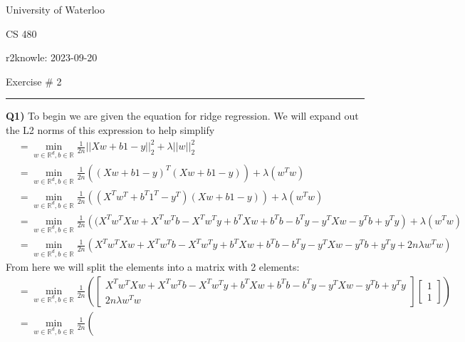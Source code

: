 \documentclass{article}
\begin{document}
\begin{titlepage}
	\setlength{\parindent}{0pt}
	\large

\vspace*{-2cm}


University of Waterloo \par
CS 480 \par
\vspace{0.05cm}
r2knowle: 2023-09-20
\vspace{0.2cm}

{\huge Exercise \# 2 \par}
\hrule

\vspace{0.5cm}
\textbf{Q1)} To begin we are given the equation for ridge regression. We will expand out the L2 norms of this expression to help simplify
\begin{align*} 
&= \displaystyle \min_{w \in \mathbb{R}^d, b \in \mathbb{R}} \frac{1}{2n}||Xw + b1 - y||^2_2 + \lambda||w||^2_2 \\
&= \displaystyle \min_{w \in \mathbb{R}^d, b \in \mathbb{R}} 
\frac{1}{2n} \left( (Xw + b1 - y)^T(Xw + b1 - y) \right) + \lambda \left( w^Tw \right) \\
&= \displaystyle \min_{w \in \mathbb{R}^d, b \in \mathbb{R}} 
\frac{1}{2n} \left( (X^Tw^T + b^T1^T - y^T)(Xw + b1 - y) \right) + \lambda \left( w^Tw \right) \\
&= \displaystyle \min_{w \in \mathbb{R}^d, b \in \mathbb{R}} 
\frac{1}{2n} \left( (X^Tw^TXw + X^Tw^Tb - X^Tw^Ty +b^TXw+ b^Tb -b^Ty -y^TXw -y^Tb + y^Ty \right) + \lambda \left( w^Tw \right) \\
&= \displaystyle \min_{w \in \mathbb{R}^d, b \in \mathbb{R}} 
\frac{1}{2n} \left( X^Tw^TXw + X^Tw^Tb - X^Tw^Ty +b^TXw+ b^Tb -b^Ty -y^TXw -y^Tb + y^Ty + 2n\lambda w^Tw \right)
\end{align*}
From here we will split the elements into a matrix with 2 elements:
\begin{align*} 
&= \displaystyle \min_{w \in \mathbb{R}^d, b \in \mathbb{R}} \frac{1}{2n} \left(
\begin{bmatrix}
X^Tw^TXw + X^Tw^Tb - X^Tw^Ty +b^TXw+ b^Tb -b^Ty -y^TXw -y^Tb + y^Ty\\
2n\lambda w^Tw 
\end{bmatrix} \begin{bmatrix}
1\\
1
\end{bmatrix} \right)  \\
&= \displaystyle \min_{w \in \mathbb{R}^d, b \in \mathbb{R}} \frac{1}{2n} \left(

\end{align*}
\end{titlepage}
\end{document}
